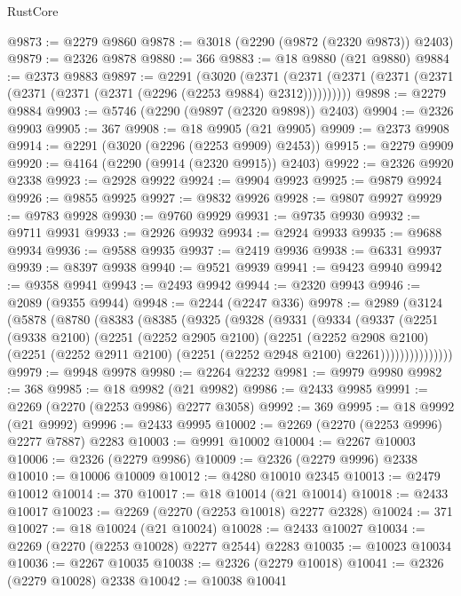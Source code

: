 \begin{lexlean}{RustCore}
\begin{coremodule}
@9873 := @2279 @9860
@9878 := @3018 (@2290 (@9872 (@2320 @9873)) @2403)
@9879 := @2326 @9878
@9880 := 366
@9883 := @18 @9880 (@21 @9880)
@9884 := @2373 @9883
@9897 := @2291
    (@3020
      (@2371 (@2371 (@2371 (@2371 (@2371 (@2371 (@2371 (@2371 (@2296 (@2253 @9884) @2312))))))))))
@9898 := @2279 @9884
@9903 := @5746 (@2290 (@9897 (@2320 @9898)) @2403)
@9904 := @2326 @9903
@9905 := 367
@9908 := @18 @9905 (@21 @9905)
@9909 := @2373 @9908
@9914 := @2291 (@3020 (@2296 (@2253 @9909) @2453))
@9915 := @2279 @9909
@9920 := @4164 (@2290 (@9914 (@2320 @9915)) @2403)
@9922 := @2326 @9920 @2338
@9923 := @2928 @9922
@9924 := @9904 @9923
@9925 := @9879 @9924
@9926 := @9855 @9925
@9927 := @9832 @9926
@9928 := @9807 @9927
@9929 := @9783 @9928
@9930 := @9760 @9929
@9931 := @9735 @9930
@9932 := @9711 @9931
@9933 := @2926 @9932
@9934 := @2924 @9933
@9935 := @9688 @9934
@9936 := @9588 @9935
@9937 := @2419 @9936
@9938 := @6331 @9937
@9939 := @8397 @9938
@9940 := @9521 @9939
@9941 := @9423 @9940
@9942 := @9358 @9941
@9943 := @2493 @9942
@9944 := @2320 @9943
@9946 := @2089 (@9355 @9944)
@9948 := @2244 (@2247 @336)
@9978 := @2989
    (@3124
      (@5878
        (@8780
          (@8383
            (@8385
              (@9325
                (@9328
                  (@9331
                    (@9334
                      (@9337
                        (@2251
                          (@9338 @2100)
                          (@2251
                            (@2252 @2905 @2100)
                            (@2251
                              (@2252 @2908 @2100)
                              (@2251
                                (@2252 @2911 @2100)
                                (@2251 (@2252 @2948 @2100) @2261)))))))))))))))
@9979 := @9948 @9978
@9980 := @2264 @2232
@9981 := @9979 @9980
@9982 := 368
@9985 := @18 @9982 (@21 @9982)
@9986 := @2433 @9985
@9991 := @2269 (@2270 (@2253 @9986) @2277 @3058)
@9992 := 369
@9995 := @18 @9992 (@21 @9992)
@9996 := @2433 @9995
@10002 := @2269 (@2270 (@2253 @9996) @2277 @7887) @2283
@10003 := @9991 @10002
@10004 := @2267 @10003
@10006 := @2326 (@2279 @9986)
@10009 := @2326 (@2279 @9996) @2338
@10010 := @10006 @10009
@10012 := @4280 @10010 @2345
@10013 := @2479 @10012
@10014 := 370
@10017 := @18 @10014 (@21 @10014)
@10018 := @2433 @10017
@10023 := @2269 (@2270 (@2253 @10018) @2277 @2328)
@10024 := 371
@10027 := @18 @10024 (@21 @10024)
@10028 := @2433 @10027
@10034 := @2269 (@2270 (@2253 @10028) @2277 @2544) @2283
@10035 := @10023 @10034
@10036 := @2267 @10035
@10038 := @2326 (@2279 @10018)
@10041 := @2326 (@2279 @10028) @2338
@10042 := @10038 @10041

\end{coremodule}
\end{lexlean}
